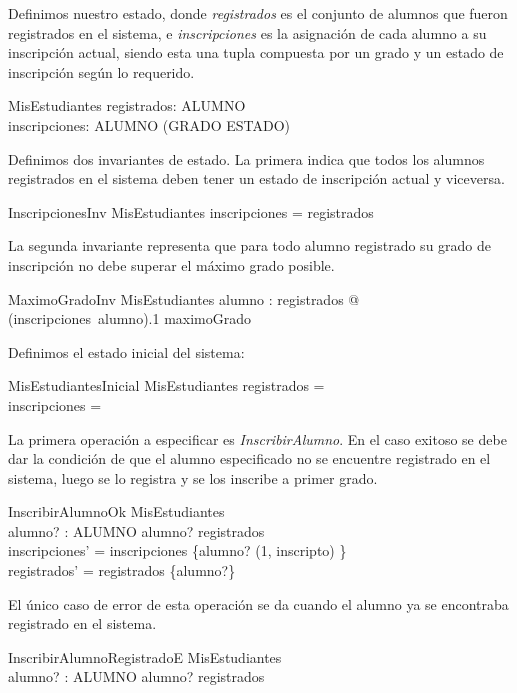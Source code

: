 \documentclass{article}
\begin{document}
Definimos nuestro estado, donde \emph{registrados} es el conjunto de alumnos que fueron registrados en el sistema, e \emph{inscripciones} es la asignación de cada alumno a su inscripción actual, siendo esta una tupla compuesta por un grado y un estado de inscripción según lo requerido.
\begin{schema}{MisEstudiantes}
  registrados: \power ALUMNO \\
  inscripciones: ALUMNO \pfun (GRADO \cross ESTADO)
\end{schema}

Definimos dos invariantes de estado. La primera indica que todos los alumnos registrados en el sistema deben tener un estado de inscripción actual y viceversa.
\begin{schema}{InscripcionesInv}
  MisEstudiantes
  \where
  \dom inscripciones = registrados
\end{schema}

La segunda invariante representa que para todo alumno registrado su grado de inscripción no debe superar el máximo grado posible.
\begin{schema}{MaximoGradoInv}
    MisEstudiantes
    \where
    \forall alumno : registrados @ (inscripciones~alumno).1 \leq maximoGrado
\end{schema}

Definimos el estado inicial del sistema:
\begin{schema}{MisEstudiantesInicial}
    MisEstudiantes
    \where
    registrados = \emptyset \\
    inscripciones = \emptyset
\end{schema}

La primera operación a especificar es \emph{InscribirAlumno}. En el caso exitoso se debe dar la condición de que el alumno especificado no se encuentre registrado en el sistema, luego se lo registra y se los inscribe a primer grado.
\begin{schema}{InscribirAlumnoOk}
    \Delta MisEstudiantes \\
    alumno? : ALUMNO
    \where
    alumno? \notin registrados \\
    inscripciones' = inscripciones \cup \{alumno? \mapsto (1, inscripto) \} \\
    registrados' = registrados \cup \{alumno?\}
\end{schema}

El único caso de error de esta operación se da cuando el alumno ya se encontraba registrado en el sistema.
\begin{schema}{InscribirAlumnoRegistradoE}
    \Xi MisEstudiantes \\
    alumno? : ALUMNO
    \where
    alumno? \in registrados
\end{schema}
\end{document}
